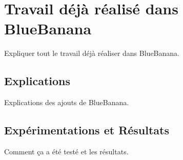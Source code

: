\section{Travail déjà réalisé dans BlueBanana}
	Expliquer tout le travail déjà réaliser dans BlueBanana.
	\subsection{Explications}
		Explications des ajouts de BlueBanana.\\ \newline
	\subsection{Expérimentations et Résultats}
		Comment ça a été testé et les résultats.
